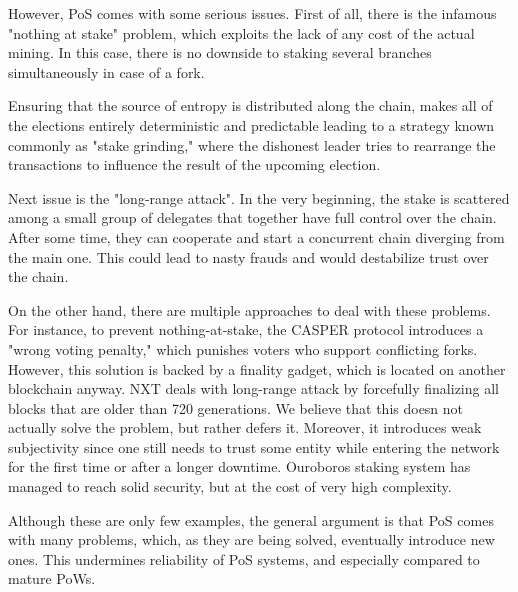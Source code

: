 However, PoS comes with some serious issues. First of all, there is the infamous
"nothing at stake"\cite{pos_flaws_nothing} problem, which exploits the lack of
any cost of the actual mining. In this case, there is no downside to staking
several branches simultaneously in case of a fork.

Ensuring that the source of entropy is distributed along the chain, makes all of
the elections entirely deterministic and predictable leading to a strategy known
commonly as "stake grinding," where the dishonest leader tries to rearrange the
transactions to influence the result of the upcoming election.

Next issue is the "long-range attack"\cite{pos_flaws_long}. In the very
beginning, the stake is scattered among a small group of delegates that together
have full control over the chain. After some time, they can cooperate and start
a concurrent chain diverging from the main one. This could lead to nasty frauds
and would destabilize trust over the chain.

On the other hand, there are multiple approaches to deal with these problems.
For instance, to prevent nothing-at-stake, the CASPER protocol introduces a
"wrong voting penalty," which punishes voters who support conflicting
forks\cite{casper}. However, this solution is backed by a finality gadget, which
is located on another blockchain anyway. NXT deals with long-range attack by
forcefully finalizing all blocks that are older than 720 generations\cite{nxt}.
We believe that this doesn not actually solve the problem, but rather defers it.
Moreover, it introduces weak subjectivity since one still needs to trust some
entity while entering the network for the first time or after a longer downtime.
Ouroboros staking system has managed to reach solid security, but at the cost of
very high complexity\cite{ouroboros}.

Although these are only few examples, the general argument is that PoS comes
with many problems, which, as they are being solved, eventually introduce new
ones. This undermines reliability of PoS systems, and especially compared to
mature PoWs.
